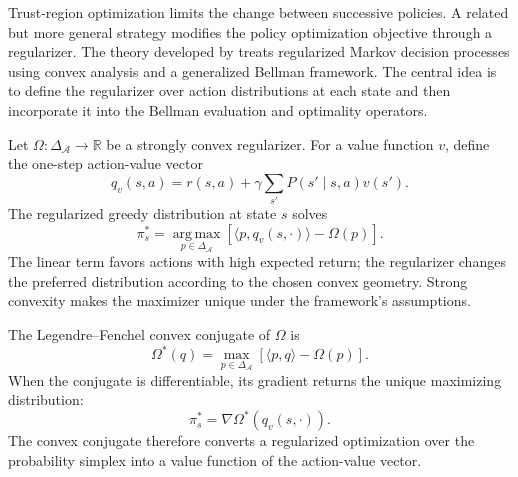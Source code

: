 Trust-region optimization limits the change between successive policies. A
related but more general strategy modifies the policy optimization objective
through a regularizer. The theory developed by
\textcite{geist2019regularized} treats regularized Markov decision processes
using convex analysis and a generalized Bellman framework. The central idea is
to define the regularizer over action distributions at each state and then
incorporate it into the Bellman evaluation and optimality operators.

Let $\Omega:\Delta_{\mathcal A}\rightarrow\mathbb{R}$ be a strongly convex
regularizer. For a value function $v$, define the one-step action-value vector
\begin{equation}
    q_v(s,a)
    =r(s,a)+\gamma\sum_{s'}P(s'\mid s,a)v(s').
    \label{eq:rl-one-step-q}
\end{equation}
The regularized greedy distribution at state $s$ solves
\begin{equation}
    \pi^*_s
    =\operatorname*{arg\,max}_{p\in\Delta_{\mathcal A}}
      \left[\langle p,q_v(s,\cdot)\rangle-\Omega(p)\right].
    \label{eq:rl-regularized-greedy}
\end{equation}
The linear term favors actions with high expected return; the regularizer
changes the preferred distribution according to the chosen convex geometry.
Strong convexity makes the maximizer unique under the framework's assumptions.

The Legendre--Fenchel convex conjugate of $\Omega$ is
\begin{equation}
    \Omega^*(q)
    =\max_{p\in\Delta_{\mathcal A}}
      \left[\langle p,q\rangle-\Omega(p)\right].
    \label{eq:rl-legendre-fenchel}
\end{equation}
When the conjugate is differentiable, its gradient returns the unique
maximizing distribution:
\begin{equation}
    \pi_s^*=\nabla\Omega^*(q_v(s,\cdot)).
    \label{eq:rl-conjugate-policy}
\end{equation}
The convex conjugate therefore converts a regularized optimization over the
probability simplex into a value function of the action-value vector.

